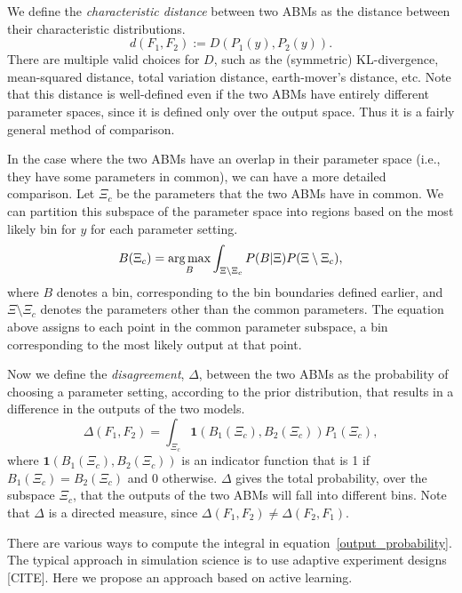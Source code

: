 We define the \emph{characteristic distance} between two ABMs as the distance between their characteristic distributions.
\begin{equation}
d(F_1, F_2) := D(P_1(y), P_2(y)).
\end{equation}
There are multiple valid choices for $D$, such as the (symmetric) KL-divergence, mean-squared distance, total variation distance, earth-mover's distance, etc. Note that this distance is well-defined even if the two ABMs have entirely different parameter spaces, since it is defined only over the output space. Thus it is a fairly general method of comparison.

In the case where the two ABMs have an overlap in their parameter space (i.e., they have some parameters in common), we can have a more detailed comparison. Let $\Xi_{c}$ be the parameters that the two ABMs have in common. We can partition this subspace of the parameter space into regions based on the most likely bin for $y$ for each parameter setting.
\begin{equation}
    B(\Xi_{c}) = \operatorname*{arg\,max}_B \int_{\Xi \setminus \Xi_{c}} P(B|\Xi)P(\Xi \setminus \Xi_{c}),
\end{equation}
where $B$ denotes a bin, corresponding to the bin boundaries defined earlier, and $\Xi \setminus \Xi_{c}$ denotes the parameters other than the common parameters. The equation above assigns to each point in the common parameter subspace, a bin corresponding to the most likely output at that point.

Now we define the \emph{disagreement}, $\Delta$, between the two ABMs as the probability of choosing a parameter setting, according to the prior distribution, that results in a difference in the outputs of the two models.
\begin{equation}
    \Delta(F_1, F_2) = \int_{\Xi_{c}} \mathbf{1}(B_1(\Xi_{c}), B_2(\Xi_{c}))P_1(\Xi_{c}),
\end{equation}
where $\mathbf{1}(B_1(\Xi_{c}), B_2(\Xi_{c}))$ is an indicator function that is 1 if $B_1(\Xi_{c}) = B_2(\Xi_{c})$ and 0 otherwise. $\Delta$ gives the total probability, over the subspace $\Xi_c$, that the outputs of the two ABMs will fall into different bins. Note that $\Delta$ is a directed measure, since $\Delta(F_1, F_2) \ne \Delta(F_2, F_1)$.

There are various ways to compute the integral in equation~\ref{output_probability}. The typical approach in simulation
science is to use adaptive experiment designs [CITE]. Here we propose an approach based on active learning.